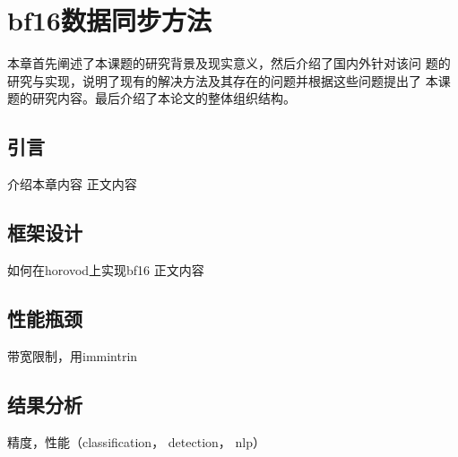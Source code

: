 \chapter{bf16数据同步方法}
本章首先阐述了本课题的研究背景及现实意义，然后介绍了国内外针对该问 题的研究与实现，说明了现有的解决方法及其存在的问题并根据这些问题提出了 本课题的研究内容。最后介绍了本论文的整体组织结构。
\section{引言}
介绍本章内容
正文内容
\section{框架设计}
如何在horovod上实现bf16
正文内容

\section{性能瓶颈}
带宽限制，用immintrin

\section{结果分析}
精度，性能（classification， detection， nlp）